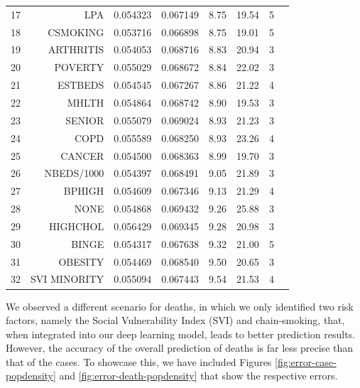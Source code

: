 \documentclass[letterpaper, inpress]{jds} %
\renewcommand{\_}{%
    \textunderscore\hspace{0pt}%
}
\begin{document}
\begin{table}[!p]
\begin{tabular}{rrrrrlrl}
17 & LPA & 0.054323 & 0.067149 & 8.75 & 19.54 & 5 \\
18 & CSMOKING & 0.053716 & 0.066898 & 8.75 & 19.01 & 5 \\
19 & ARTHRITIS & 0.054053 & 0.068716 & 8.83 & 20.94 & 3 \\
20 & POVERTY & 0.055029 & 0.068672 & 8.84 & 22.02 & 3 \\
21 & ESTBEDS & 0.054545 & 0.067267 & 8.86 & 21.22 & 4 \\
22 & MHLTH & 0.054864 & 0.068742 & 8.90 & 19.53 & 3 \\
23 & SENIOR & 0.055079 & 0.069024 & 8.93 & 21.23 & 3 \\
24 & COPD & 0.055589 & 0.068250 & 8.93 & 23.26 & 4 \\
25 & CANCER & 0.054500 & 0.068363 & 8.99 & 19.70 & 3 \\
26 & NBEDS/1000 & 0.054397 & 0.068491 & 9.05 & 21.89 & 3 \\
27 & BPHIGH & 0.054609 & 0.067346 & 9.13 & 21.29 & 4 \\
\rowcolor{black!5} 28 & NONE & 0.054868 & 0.069432 & 9.26 & 25.88 & 3 \\
29 & HIGHCHOL & 0.056429 & 0.069345 & 9.28 & 20.98 & 3 \\
30 & BINGE & 0.054317 & 0.067638 & 9.32 & 21.00 & 5 \\
31 & OBESITY & 0.054469 & 0.068540 & 9.50 & 20.65 & 3 \\
32 & SVI\_MINORITY & 0.055094 & 0.067443 & 9.54 & 21.53 & 4 \\
\bottomrule
\end{tabular}
\end{table}

We observed a different scenario for deaths, in which we only
identified two risk factors, namely the Social Vulnerability Index
(SVI) and chain-smoking, that, when integrated into our deep learning
model, leads to better prediction results. However, the accuracy of
the overall prediction of deaths is far less precise than that of the
cases. To showcase this, we have included Figures
\ref{fig:error-case-popdensity} and \ref{fig:error-death-popdensity}
that show the respective errors.
\end{document}
